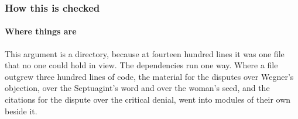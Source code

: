 \documentclass[11pt]{article}
\begin{document}
\subsubsection*{How this is checked}
\paragraph*{Where things are}
\leavevmode\par\nobreak
This argument is a directory, because at fourteen hundred lines it was one file that no one could hold in view. The dependencies run one way. Where a file outgrew three hundred lines of code, the material for the disputes over Wegner’s objection, over the Septuagint’s word and over the woman’s seed, and the citations for the dispute over the critical denial, went into modules of their own beside it.
\end{document}
